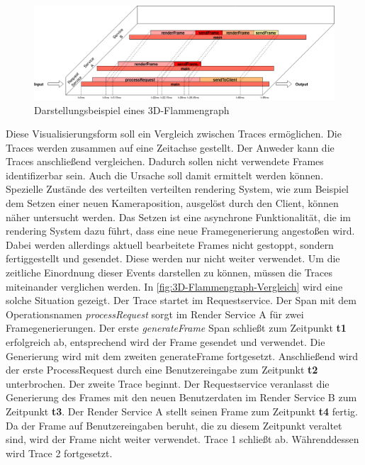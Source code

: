 \begin{figure}[!ht]
	\centering
	\hspace*{-2cm}  
	\includegraphics[scale=0.36]{img/Design/3D-Flammengraph-Konzept.png}
	\caption[Darstellungsbeispiel eines 3D-Flammengraph ]{ Darstellungsbeispiel eines 3D-Flammengraph}
	\label{fig:3D-Flammengraph-Konzept}
\end{figure}

Diese Visualisierungsform soll ein Vergleich zwischen Traces ermöglichen. Die Traces werden zusammen auf eine Zeitachse gestellt. Der Anweder kann die Traces anschließend vergleichen. Dadurch sollen nicht verwendete Frames identifizerbar sein. Auch die Ursache soll damit ermittelt werden können. Spezielle Zustände des verteilten verteilten rendering System, wie zum Beispiel dem Setzen einer neuen Kameraposition, ausgelöst durch den Client, können näher untersucht werden. Das Setzen ist eine asynchrone Funktionalität, die im rendering System dazu führt, dass eine neue Framegenerierung angestoßen wird. Dabei werden allerdings aktuell bearbeitete Frames nicht gestoppt, sondern fertiggestellt und gesendet. Diese werden nur nicht weiter verwendet. Um die zeitliche Einordnung dieser Events darstellen zu können, müssen die Traces miteinander verglichen werden. In \cref{fig:3D-Flammengraph-Vergleich} wird eine solche Situation gezeigt. Der Trace startet im Requestservice. Der Span mit dem Operationsnamen \emph{processRequest} sorgt im Render Service A für zwei Framegenerierungen. Der erste \emph{generateFrame} Span schließt zum Zeitpunkt \textbf{t1} erfolgreich ab, entsprechend wird der Frame gesendet und verwendet. Die Generierung wird mit dem zweiten generateFrame fortgesetzt. Anschließend wird der erste ProcessRequest durch eine Benutzereingabe zum Zeitpunkt \textbf{t2} unterbrochen. Der zweite Trace beginnt. Der Requestservice veranlasst die Generierung des Frames mit den neuen Benutzerdaten im Render Service B zum Zeitpunkt \textbf{t3}. Der Render Service A stellt seinen Frame zum Zeitpunkt \textbf{t4} fertig. Da der Frame auf Benutzereingaben beruht, die zu diesem Zeitpunkt veraltet sind, wird der Frame nicht weiter verwendet. Trace 1 schließt ab. Währenddessen wird Trace 2 fortgesetzt.

